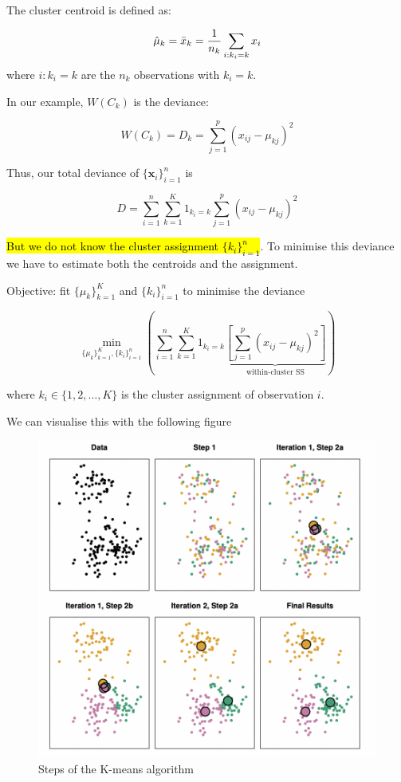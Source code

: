 \documentclass[11pt]{article}
\begin{document}
The cluster centroid is defined as:

\begin{equation*}
    \hat{\mu}_k = \Bar{x}_k = \dfrac{1}{n_k}\sum_{i:k_i = k}x_i
\end{equation*}
where $i: k_i = k$ are the $n_k$ observations with $k_i = k$.

In our example, $W(C_k)$ is the deviance:

\begin{equation*}
    W(C_k) = D_k = \sum_{j=1}^p (x_{ij} - \mu_{kj})^2
\end{equation*}

Thus, our total deviance of $\{\mathbf{x}_i\}_{i=1}^n$ is 

\begin{equation*}
    D = \sum_{i=1}^n \sum_{k=1}^K 1_{k_i = k} \sum_{j=1}^p (x_{ij} - \mu_{kj})^2
\end{equation*}

\hl{But we do not know the cluster assignment $\{k_i\}_{i=1}^n$}. To minimise this deviance we have to estimate both the centroids and the assignment.

Objective: fit $\{\mu_k\}_{k=1}^K$ and $\{k_i\}_{i=1}^n$ to minimise the deviance

\begin{equation}
    \underset{\{\mu_k\}_{k=1}^K,\{k_i\}_{i=1}^n}{\min}\left(\sum_{i=1}^n \sum_{k=1}^K 1_{k_i = k} \underbrace{\left[\sum_{j=1}^p (x_{ij} - \mu_{kj})^2\right]}_{\text{within-cluster SS}}\right)
\end{equation}

where $k_i \in \{1,2,\ldots, K\}$ is the cluster assignment of observation $i$.

We can visualise this with the following figure

\begin{figure}[h]
    \centering
    \includegraphics[width=13cm]{pic/k-means algo.png}
    \caption{Steps of the K-means algorithm}
    \label{fig:k-means algo}
\end{figure}
\end{document}
